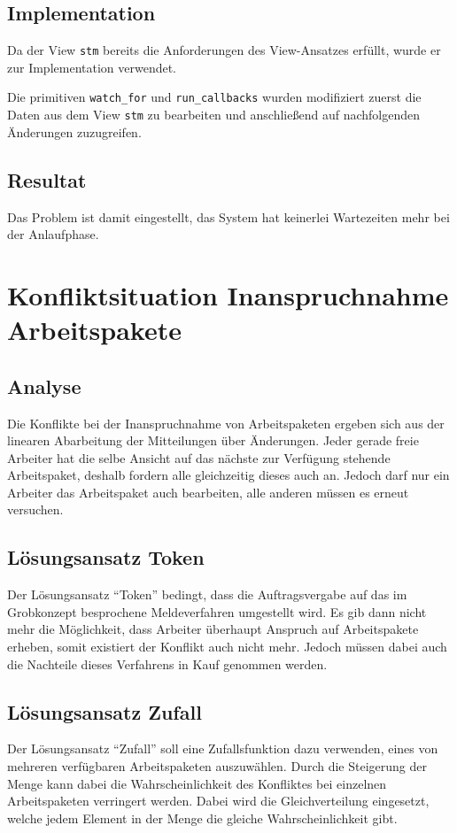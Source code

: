 \subsection{Implementation}
Da der View \verb|stm| bereits die Anforderungen des View-Ansatzes erfüllt,
wurde er zur Implementation verwendet.

Die primitiven \verb|watch_for| und \verb|run_callbacks| wurden modifiziert zuerst
die Daten aus dem View \verb|stm| zu bearbeiten und anschließend 
auf nachfolgenden Änderungen zuzugreifen.

\subsection{Resultat}
Das Problem ist damit eingestellt, das System hat keinerlei Wartezeiten mehr bei der Anlaufphase.


\section{Konfliktsituation Inanspruchnahme Arbeitspakete}
\subsection{Analyse}
Die Konflikte bei der Inanspruchnahme von Arbeitspaketen ergeben sich aus der linearen Abarbeitung der Mitteilungen über Änderungen.
Jeder gerade freie Arbeiter hat die selbe Ansicht auf das nächste zur Verfügung stehende Arbeitspaket, deshalb fordern alle gleichzeitig dieses auch an.
Jedoch darf nur ein Arbeiter das Arbeitspaket auch bearbeiten,
alle anderen müssen es erneut versuchen.

\subsection{Lösungsansatz Token}
Der Lösungsansatz ``Token'' bedingt, dass die Auftragsvergabe auf das im Grobkonzept besprochene Meldeverfahren umgestellt wird.
Es gib dann nicht mehr die Möglichkeit, dass Arbeiter überhaupt Anspruch auf Arbeitspakete erheben, somit existiert der Konflikt auch nicht mehr.
Jedoch müssen dabei auch die Nachteile dieses Verfahrens in Kauf genommen werden.

\subsection{Lösungsansatz Zufall}

Der Lösungsansatz ``Zufall'' soll eine Zufallsfunktion dazu verwenden,
eines von mehreren verfügbaren Arbeitspaketen auszuwählen.
Durch die Steigerung der Menge kann dabei die Wahrscheinlichkeit des Konfliktes bei einzelnen Arbeitspaketen verringert werden. Dabei wird die Gleichverteilung eingesetzt, welche jedem Element in der Menge die gleiche Wahrscheinlichkeit gibt.

